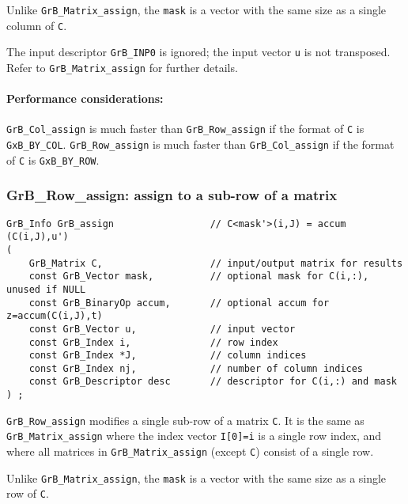 \documentclass[12pt]{article}
\begin{document}
Unlike \verb'GrB_Matrix_assign', the \verb'mask' is a vector with the same size
as a single column of \verb'C'.

The input descriptor \verb'GrB_INP0' is ignored; the input vector \verb'u' is
not transposed.  Refer to \verb'GrB_Matrix_assign' for further details.

\paragraph{\bf Performance considerations:} %
\verb'GrB_Col_assign' is much faster than \verb'GrB_Row_assign' if the format
of \verb'C' is \verb'GxB_BY_COL'.  \verb'GrB_Row_assign' is much faster than
\verb'GrB_Col_assign' if the format of \verb'C' is \verb'GxB_BY_ROW'.

\newpage
\subsubsection{{\sf GrB\_Row\_assign:} assign to a sub-row of a matrix}
\label{assign_row}

\begin{mdframed}[userdefinedwidth=6in]
{\footnotesize
\begin{verbatim}
GrB_Info GrB_assign                 // C<mask'>(i,J) = accum (C(i,J),u')
(
    GrB_Matrix C,                   // input/output matrix for results
    const GrB_Vector mask,          // optional mask for C(i,:), unused if NULL
    const GrB_BinaryOp accum,       // optional accum for z=accum(C(i,J),t)
    const GrB_Vector u,             // input vector
    const GrB_Index i,              // row index
    const GrB_Index *J,             // column indices
    const GrB_Index nj,             // number of column indices
    const GrB_Descriptor desc       // descriptor for C(i,:) and mask
) ;
\end{verbatim} } \end{mdframed}

\verb'GrB_Row_assign' modifies a single sub-row of a matrix \verb'C'.  It is
the same as \verb'GrB_Matrix_assign' where the index vector \verb'I[0]=i' is
a single row index, and where all matrices in \verb'GrB_Matrix_assign'
(except \verb'C') consist of a single row.

Unlike \verb'GrB_Matrix_assign', the \verb'mask' is a vector with the same size
as a single row of \verb'C'.
\end{document}
